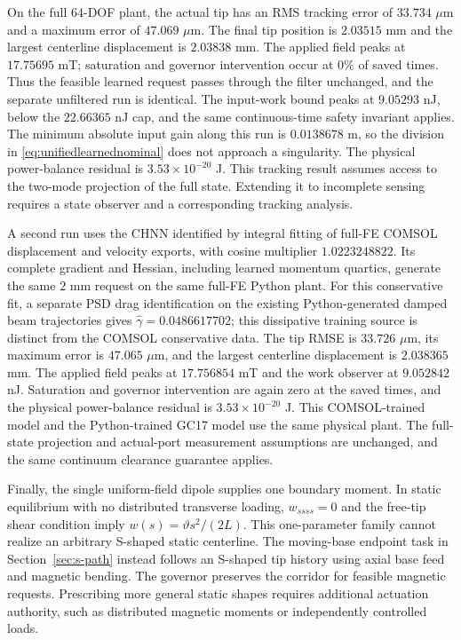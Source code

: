 On the full $64$-DOF plant, the actual tip has an RMS tracking error of
$33.734$ $\mu$m and a maximum error of $47.069$ $\mu$m.  The final tip
position is $2.03515$ mm and the largest centerline displacement is
$2.03838$ mm.  The applied field peaks at $17.75695$ mT; saturation and
governor intervention occur at $0\%$ of saved times.  Thus the feasible
learned request passes through the filter unchanged, and the separate
unfiltered run is identical.  The input-work bound peaks at $9.05293$ nJ,
below the $22.66365$ nJ cap, and the same continuous-time safety invariant
applies.  The minimum absolute input gain along this run is
$0.0138678$ m, so the division in \eqref{eq:unifiedlearnednominal} does
not approach a singularity.  The physical power-balance residual is
$3.53\times10^{-20}$ J. This tracking result assumes access to the
two-mode projection of the full state. Extending it to incomplete sensing
requires a state observer and a corresponding tracking analysis.



A second run uses the CHNN identified by integral fitting of full-FE
COMSOL displacement and velocity exports, with
cosine multiplier $1.0223248822$. Its complete gradient and Hessian,
including learned momentum quartics, generate the same $2$ mm request
on the same full-FE Python plant. For this conservative fit, a separate
PSD drag identification on the existing Python-generated damped beam
trajectories gives $\widehat\gamma=0.0486617702$; this dissipative
training source is distinct from the COMSOL conservative data.
The tip RMSE is $33.726$ $\mu$m, its maximum error is $47.065$ $\mu$m,
and the largest centerline displacement is $2.038365$ mm.
The applied field peaks at $17.756854$ mT and the work observer at
$9.052842$ nJ. Saturation and governor intervention are again zero at
the saved times, and the physical power-balance residual is
$3.53\times10^{-20}$ J. This COMSOL-trained model and the Python-trained
GC17 model use the same physical plant.
The full-state projection and actual-port measurement assumptions are
unchanged, and the same continuum clearance guarantee applies.

Finally, the single uniform-field dipole supplies one boundary moment.
In static equilibrium with no distributed transverse loading,
$w_{ssss}=0$ and the free-tip shear condition imply
$w(s)=\vartheta s^2/(2L)$.
This one-parameter family cannot realize an arbitrary S-shaped static centerline.
The moving-base endpoint task in Section~\ref{sec:s-path} instead follows an
S-shaped tip history using axial base feed and magnetic bending.
The governor preserves the corridor for feasible magnetic requests.
Prescribing more general static shapes requires additional actuation
authority, such as distributed magnetic moments or independently
controlled loads.
